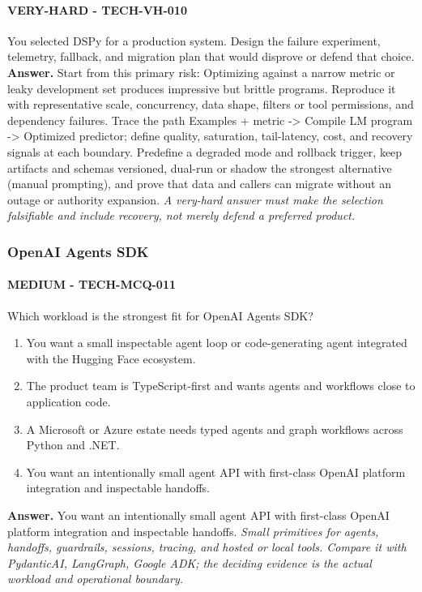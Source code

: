 \paragraph{VERY-HARD - TECH-VH-010} You selected DSPy for a production system. Design the failure experiment, telemetry, fallback, and migration plan that would disprove or defend that choice.
\textbf{Answer.} Start from this primary risk: Optimizing against a narrow metric or leaky development set produces impressive but brittle programs. Reproduce it with representative scale, concurrency, data shape, filters or tool permissions, and dependency failures. Trace the path Examples + metric -> Compile LM program -> Optimized predictor; define quality, saturation, tail-latency, cost, and recovery signals at each boundary. Predefine a degraded mode and rollback trigger, keep artifacts and schemas versioned, dual-run or shadow the strongest alternative (manual prompting), and prove that data and callers can migrate without an outage or authority expansion.
\textit{A very-hard answer must make the selection falsifiable and include recovery, not merely defend a preferred product.}
\subsubsection*{OpenAI Agents SDK}
\paragraph{MEDIUM - TECH-MCQ-011} Which workload is the strongest fit for OpenAI Agents SDK?
\begin{enumerate}[label=\Alph*.]
\item You want a small inspectable agent loop or code-generating agent integrated with the Hugging Face ecosystem.
\item The product team is TypeScript-first and wants agents and workflows close to application code.
\item A Microsoft or Azure estate needs typed agents and graph workflows across Python and .NET.
\item You want an intentionally small agent API with first-class OpenAI platform integration and inspectable handoffs.
\end{enumerate}
\textbf{Answer.} You want an intentionally small agent API with first-class OpenAI platform integration and inspectable handoffs.
\textit{Small primitives for agents, handoffs, guardrails, sessions, tracing, and hosted or local tools. Compare it with PydanticAI, LangGraph, Google ADK; the deciding evidence is the actual workload and operational boundary.}

